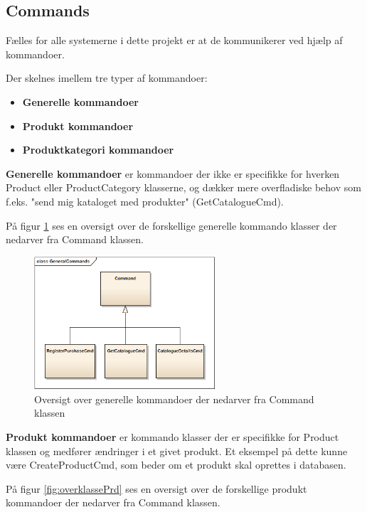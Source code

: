 \subsection{Commands}\label{COMMANDS}
Fælles for alle systemerne i dette projekt er at de kommunikerer ved hjælp af kommandoer. 

Der skelnes imellem tre typer af kommandoer:

\begin{itemize}
\item \textbf{Generelle kommandoer} 
\item \textbf{Produkt kommandoer} 
\item \textbf{Produktkategori kommandoer}
\end{itemize}

\textbf{Generelle kommandoer} er kommandoer der ikke er specifikke for hverken Product eller ProductCategory klasserne, og dækker mere overfladiske behov som f.eks. "send mig kataloget med produkter" (GetCatalogueCmd).

På figur \ref{fig:overklasseGen} ses en oversigt over de forskellige generelle kommando klasser der nedarver fra Command klassen.

\begin{figure}[H]
    \centering
    \includegraphics[width=0.6\textwidth]{Systemdesign/SharedLib/Images/Commands/GeneralCommands.png}
    \caption{Oversigt over generelle kommandoer der nedarver fra Command klassen}
    \label{fig:overklasseGen}
\end{figure}

\textbf{Produkt kommandoer} er kommando klasser der er specifikke for Product klassen og medfører ændringer i et givet produkt. Et eksempel på dette kunne være CreateProductCmd, som beder om et produkt skal oprettes i databasen.

På figur \ref{fig:overklassePrd} ses en oversigt over de forskellige produkt kommandoer der nedarver fra Command klassen.

